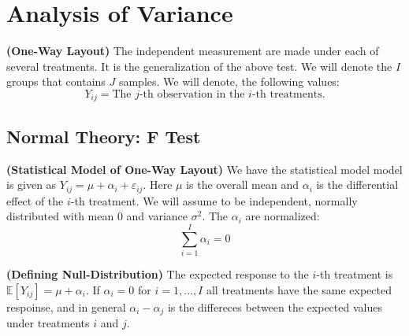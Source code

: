 \section{Analysis of Variance}

\begin{definition}{\textbf{(One-Way Layout)}}
    The independent measurement are made under each of several treatments. It is the generalization of the above test. We will denote the $I$ groups that contains $J$ samples. We will denote, the following values:
    \begin{equation*}
        Y_{ij} = \text{The } j\text{-th observation in the } i\text{-th treatments.} 
    \end{equation*}
\end{definition}

\subsection{Normal Theory: F Test}

\begin{remark}{\textbf{(Statistical Model of One-Way Layout)}}
    We have the statistical model model is given as $Y_{ij} = \mu + \alpha_i + \varepsilon_{ij}$. Here $\mu$ is the overall mean and $\alpha_i$ is the differential effect of the $i$-th treatment. We will assume to be independent, normally distributed with mean $0$ and variance $\sigma^2$. The $\alpha_i$ are normalized:
    \begin{equation*}
        \sum^I_{i=1}\alpha_i = 0
    \end{equation*}
\end{remark}

\begin{remark}{\textbf{(Defining Null-Distribution)}}
    The expected response to the $i$-th treatment is $\mathbb{E}[Y_{ij}] = \mu + \alpha_i$. If $\alpha_i = 0$ for $i=1,\dots,I$ all treatments have the same expected respoinse, and in general $\alpha_i - \alpha_j$ is the differeces between the expected values under treatments $i$ and $j$. 
\end{remark}

